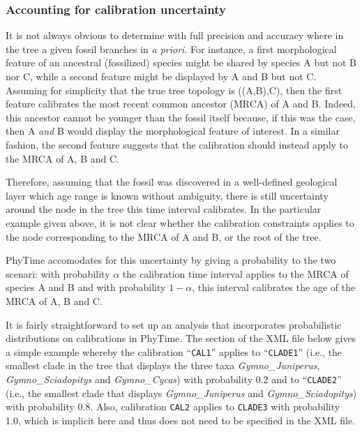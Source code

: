 \documentclass[a4paper,12pt]{article}
\newcommand{\x}[1]{\texttt{#1}}
\begin{document}
\subsubsection{Accounting for calibration uncertainty}

It is not always obvious to determine with full precision and accuracy where in the tree a given
fossil branches in {\em a priori}. For instance, a first morphological feature of an ancestral (fossilized) species
might be shared by species A but not B nor C, while a second feature might be displayed by A and B but
not C. Assuming for simplicity that the true tree topology is ((A,B),C), then the first feature calibrates the most recent common ancestor (MRCA) of A and
B. Indeed, this ancestor cannot be younger than the fossil itself because, if this was  the case, then
A {\em and} B would display the morphological feature of interest. In a similar fashion, the second
feature suggests that the calibration should instead apply to the MRCA of A, B and C. 

Therefore, assuming  that the fossil was discovered in a
well-defined geological layer which age range is known without ambiguity, there is still uncertainty
around the node in the tree this time interval calibrates. In the particular example given above, it
is not clear whether the calibration constraints applies to the node corresponding to the MRCA of A
and B, or the root of the tree.

PhyTime accomodates for this uncertainty by giving a
probability to the two scenari: with probability $\alpha$ the calibration time interval applies to
the MRCA of species A and B and with probability $1-\alpha$, this interval calibrates the age of the
MRCA of A, B and C. 

It is fairly straightforward to set up an analysis that incorporates probabilistic distributions on
calibrations in PhyTime. The section of the XML file below gives a simple example whereby the
calibration  ``\x{CAL1}'' applies to ``\x{CLADE1}'' (i.e., the smallest clade in the tree that
displays the three taxa {\em Gymno\_Juniperus},
  {\em Gymno\_Sciadopitys} and {\em Gymno\_Cycas}) with probability 0.2 and to ``\x{CLADE2}'' (i.e.,
  the smallest clade that displays {\em  Gymno\_Juniperus} and {\em Gymno\_Sciadopitys}) with probability 0.8.
Also, calibration \x{CAL2} applies to \x{CLADE3} with probability 1.0, which is implicit here and
thus does not need to be specified in the XML file.
\end{document}
